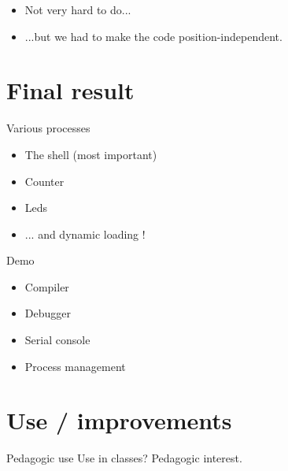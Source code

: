 \documentclass{beamer}
\begin{document}
    \begin{frame}
      \begin{itemize}
        \item Not very hard to do...
        \item ...but we had to make the code position-independent.
      \end{itemize}
    \end{frame}

  \section{Final result}
 
  \begin{frame}{Various processes}
      \begin{itemize}
        \item The shell (most important)
        \item Counter
        \item Leds
        \item ... and dynamic loading !
      \end{itemize}
  \end{frame}

  \begin{frame}{Demo}
    \begin{itemize}
      \item Compiler
      \item Debugger
      \item Serial console
      \item Process management
    \end{itemize}
  \end{frame}

  \section{Use / improvements}

  \begin{frame}{Pedagogic use}
      Use in classes? Pedagogic interest.
  \end{frame}
\end{document}
